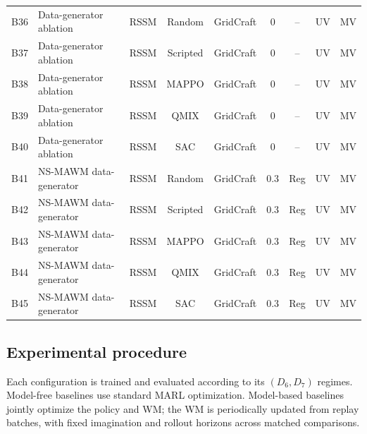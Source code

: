 \documentclass{article}
\theoremstyle{plain}
\theoremstyle{definition}
\theoremstyle{remark}
\begin{document}
\begin{table}[h!]
{\begin{tabular}{llccccccc}
      B36           & Data-generator ablation &
      RSSM          & Random                  & GridCraft      & 0   & --       & UV & MV \\
      B37           & Data-generator ablation &
      RSSM          & Scripted                & GridCraft      & 0   & --       & UV & MV \\
      B38           & Data-generator ablation &
      RSSM          & MAPPO                   & GridCraft      & 0   & --       & UV & MV \\
      B39           & Data-generator ablation &
      RSSM          & QMIX                    & GridCraft      & 0   & --       & UV & MV \\
      B40           & Data-generator ablation &
      RSSM          & SAC                     & GridCraft      & 0   & --       & UV & MV \\

      \midrule

      B41           & NS-MAWM data-generator  &
      RSSM          & Random                  & GridCraft      & 0.3 & Reg      & UV & MV \\
      B42           & NS-MAWM data-generator  &
      RSSM          & Scripted                & GridCraft      & 0.3 & Reg      & UV & MV \\
      B43           & NS-MAWM data-generator  &
      RSSM          & MAPPO                   & GridCraft      & 0.3 & Reg      & UV & MV \\
      B44           & NS-MAWM data-generator  &
      RSSM          & QMIX                    & GridCraft      & 0.3 & Reg      & UV & MV \\
      B45           & NS-MAWM data-generator  &
      RSSM          & SAC                     & GridCraft      & 0.3 & Reg      & UV & MV \\

      \bottomrule
    \end{tabular}
  }
\end{table}

\subsection{Experimental procedure}

Each configuration is trained and evaluated according to its $(D_6,D_7)$ regimes. Model-free baselines use standard MARL optimization. Model-based baselines jointly optimize the policy and WM; the WM is periodically updated from replay batches, with fixed imagination and rollout horizons across matched comparisons.
\end{document}
